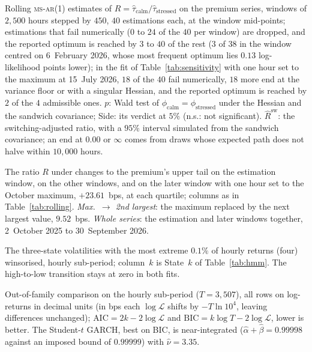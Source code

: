 \documentclass[10pt,a4paper]{article}
\newcommand{\MSAR}{\textsc{ms-ar}}
\begin{document}
\begin{table}[!htbp]
  \centering
  \caption{Rolling \MSAR(1) estimates of $R = \hat\tau_{\text{calm}}/\hat\tau_{\text{stressed}}$ on the premium series, windows of $2{,}500$ hours stepped by $450$, $40$ estimations each, at the window mid-points; estimations that fail numerically ($0$ to $24$ of the $40$ per window) are dropped, and the reported optimum is reached by $3$ to $40$ of the rest ($3$ of $38$ in the window centred on 6~February 2026, whose most frequent optimum lies $0.13$ log-likelihood points lower); in the fit of Table~\ref{tab:sensitivity} with one hour set to the maximum at 15~July 2026, $18$ of the $40$ fail numerically, $18$ more end at the variance floor or with a singular Hessian, and the reported optimum is reached by $2$ of the $4$ admissible ones. $p$: Wald test of $\phi_{\text{calm}} = \phi_{\text{stressed}}$ under the Hessian and the sandwich covariance; Side: its verdict at $5\%$ (n.s.: not significant). $\hat R^{\text{sw}}$: the switching-adjusted ratio, with a $95\%$ interval simulated from the sandwich covariance; an end at $0.00$ or $\infty$ comes from draws whose expected path does not halve within $10{,}000$ hours.}
  \label{tab:rolling}
  \small
  
\end{table}

\begin{table}[!htbp]
  \centering
  \caption{The ratio $R$ under changes to the premium's upper tail on the estimation window, on the other windows, and on the later window with one hour set to the October maximum, $+23.61$~bps, at each quartile; columns as in Table~\ref{tab:rolling}. \emph{Max.\ $\to$ 2nd largest}: the maximum replaced by the next largest value, $9.52$~bps. \emph{Whole series}: the estimation and later windows together, 2~October 2025 to 30~September 2026.}
  \label{tab:sensitivity}
  \footnotesize
  
\end{table}

\begin{table}[!htbp]
  \centering
  \caption{The three-state volatilities with the most extreme $0.1\%$ of hourly returns (four) winsorised, hourly sub-period; column~$k$ is State~$k$ of Table~\ref{tab:hmm}. The high-to-low transition stays at zero in both fits.}
  \label{tab:robust}
  \footnotesize
  
\end{table}

\begin{table}[!htbp]
  \centering
  \caption{Out-of-family comparison on the hourly sub-period ($T = 3{,}507$), all rows on log-returns in decimal units (in bps each $\log\mathcal{L}$ shifts by $-T\ln 10^4$, leaving differences unchanged); $\text{AIC} = 2k - 2\log\mathcal{L}$ and $\text{BIC} = k\log T - 2\log\mathcal{L}$, lower is better. The Student-$t$ GARCH, best on BIC, is near-integrated ($\hat\alpha + \hat\beta = 0.99998$ against an imposed bound of $0.99999$) with $\hat\nu = 3.35$.}
  \label{tab:benchmarks}
  \footnotesize
  
\end{table}
\end{document}
